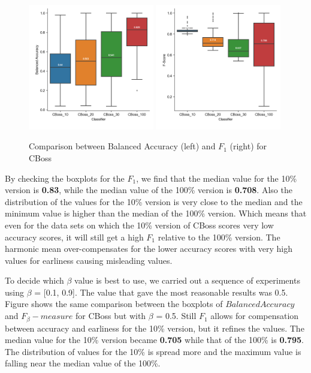 \begin{figure}[!htbp]
  \captionsetup{justification=raggedright}
  \includegraphics[width=0.49\textwidth,keepaspectratio]{boxplot_accuracy_CBoss.png}
  \includegraphics[width=0.49\textwidth,keepaspectratio]{boxplot_f_score_1_CBoss.png}
  \caption{Comparison between Balanced Accuracy (left) and $F_{1}$ (right) for CBoss}
  \label{fig:FBeta1}
\end{figure}

By checking the boxplots for the $F_{1}$, we find that the median value for the 10\% version is \textbf{0.83}, while the median value of the 100\% version is \textbf{0.708}.
Also the distribution of the values for the 10\% version is very close to the median and the minimum value is higher than the median of the 100\% version.
Which means that even for the data sets on which the 10\% version of CBoss scores very low accuracy scores, it will still get a high $F_{1}$ relative to the 100\% version.
The harmonic mean over-compensates for the lower accuracy scores with very high values for earliness causing misleading values.

To decide which $\beta$ value is best to use, we carried out a sequence of experiments using $\beta$ = [0.1, 0.9].
The value that gave the most reasonable results was 0.5.
Figure shows the same comparison between the boxplots of $Balanced Accuracy$ and $F_{\beta}-measure$ for CBoss but with $\beta$ = 0.5.
Still $F_{1}$ allows for compensation between accuracy and earliness for the 10\% version, but it refines the values.
The median value for the 10\% version became \textbf{0.705} while that of the 100\% is \textbf{0.795}.
The distribution of values for the 10\% is spread more and the maximum value is falling near the median value of the 100\%.

